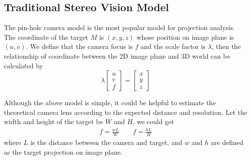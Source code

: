 \subsection{Traditional Stereo Vision Model}
The pin-hole camera model is the most popular model for projection analysis. The coordinate of the target $M$ is $(x,y,z)$ whose position on image plane is $(u,v)$. We define that the camera focus is $f$ and the scale factor is $\lambda$, then the relationship of coordinate between the 2D image plane and 3D world can be calculated by 
\begin{equation}
	\lambda\left[ {\begin{array}{*{20}{c}}
			u \\ 
			v \\ 
			f 
	\end{array}} \right] =\left[ {\begin{array}{*{20}{c}}
			x \\ 
			y \\ 
			z 
	\end{array}} \right]
\end{equation}

%

Although the above model is simple, it could be helpful to estimate the theoretical camera lens according to the expected distance and resolution. Let the width and height of the target be $W$ and $H$, we could get
\begin{align}
	f=\frac{wL}{W} \qquad f=\frac{hL}{H}
\end{align}
where $L$ is the distance between the camera and target, and $w$ and $h$ are defined as the target projection on image plane.
 

